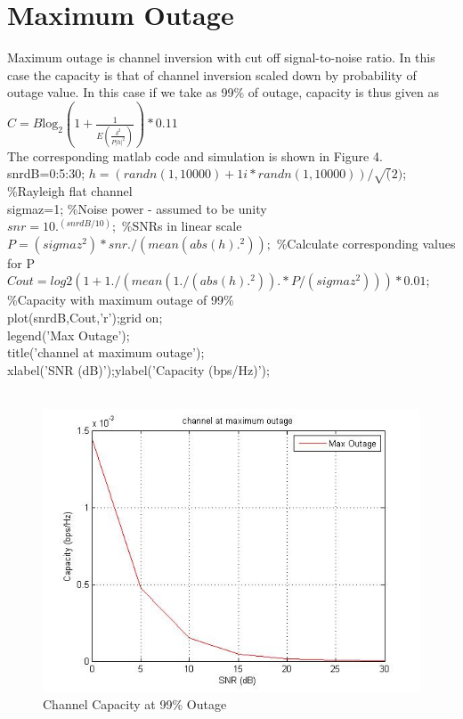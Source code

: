 \documentclass{article}
\begin{document}
\section{Maximum Outage }
Maximum outage is channel inversion with cut off signal-to-noise ratio. In this case the capacity is that of channel inversion scaled down by probability of outage value. In this case if we take as 99\% of outage, capacity is thus given as \\
$C=B{\mathrm{log}}_{2}\left(1+\frac{1}{E\left(\frac{{\delta }^{2}}{P{\left|h\right|}^{2}}\right)}\right)*0.11$\\
The corresponding matlab code and simulation is shown in Figure 4.\\

snrdB=0:5:30; %
$h= (randn(1,10000) + 1i*randn(1,10000) )/\sqrt(2)$; \%Rayleigh flat channel\\
sigmaz=1; \%Noise power - assumed to be unity\\
$snr = 10.^(snrdB/10);$ \%SNRs in linear scale\\
$P=(sigmaz^2)*snr./(mean(abs(h).^2));$ \%Calculate corresponding values for P\\
$Cout= log2(1+ 1./(mean(1./(abs(h).^2)).*P/(sigmaz^2)))*0.01$;\\ \%Capacity with maximum outage of 99\%\\
plot(snrdB,Cout,'r');grid on;\\
legend('Max Outage');\\
title('channel at maximum outage');\\
xlabel('SNR (dB)');ylabel('Capacity (bps/Hz)');\\
\\
\begin{figure}
	\centering
	\includegraphics[width=1\linewidth]{Maxi_outage}
	\caption{Channel Capacity at 99\% Outage}
	\label{fig:Maxi_outage}
\end{figure}
\end{document}
